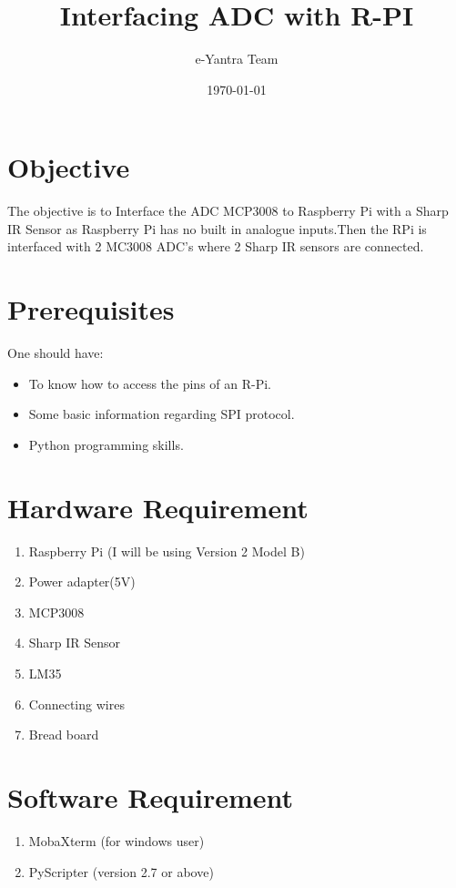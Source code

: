 \documentclass[11pt,a4paper]{article}
\title{Interfacing ADC with R-PI}
\author{e-Yantra Team}
\date{\today}
\begin{document}
	\maketitle
	\newpage
	\tableofcontents
	\newpage

	
\section{Objective}
The objective is to Interface the ADC MCP3008 to Raspberry Pi with a Sharp IR Sensor as Raspberry Pi has no built in analogue inputs.Then the RPi is interfaced with 2 MC3008 ADC's where 2 Sharp IR sensors are connected.
	\section{Prerequisites}
	One should have:
	\begin{itemize}
		\item To know how to access the pins of an R-Pi.
		\item Some basic information regarding SPI protocol.
        \item Python programming skills.
	\end{itemize}
	
	\section{Hardware Requirement}
	\begin{enumerate}
		\item Raspberry Pi (I will be using Version 2 Model B)
		\item Power adapter(5V)
		\item MCP3008
        \item Sharp IR Sensor
        \item LM35
		\item Connecting wires
		\item Bread board
	\end{enumerate}
	
	
	\section{Software Requirement}
	\begin{enumerate}
	 \item MobaXterm (for windows user)
	 \item PyScripter (version 2.7 or above)
    \end{enumerate}
	
\end{document}
